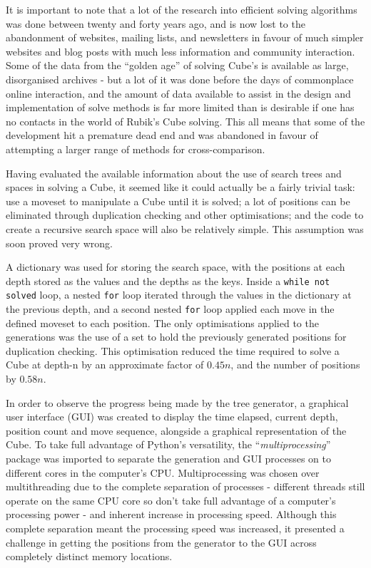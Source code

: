 \documentclass{report}
\newcommand{\tit}[1]{\textit{#1}}
\newcommand{\propernoun}[1]{\enquote{\tit{#1}}}
\newcommand{\depth}[1]{depth-#1}
\newenvironment{aside}{\begin{mdframed}[style=0,%
		leftline=false,rightline=false,leftmargin=2em,rightmargin=2em,%
		innerleftmargin=0pt,innerrightmargin=0pt,linewidth=0.75pt,%
		skipabove=7pt,skipbelow=7pt]\small}
	{\end{mdframed}}
\begin{document}
   	\begin{aside}
   		    It is important to note that a lot of the research into efficient solving algorithms was done between twenty and forty years ago, and is now lost to the abandonment of websites, mailing lists, and newsletters in favour of much simpler websites and blog posts with much less information and community interaction. Some of the data from the \enquote{golden age} of solving Cube's is available as large, disorganised archives  - but a lot of it was done before the days of commonplace online interaction, and the amount of data available to assist in the design and implementation of solve methods is far more limited than is desirable if one has no contacts in the world of Rubik's Cube solving. This all means that some of the development hit a premature dead end and was abandoned in favour of attempting a larger range of methods for cross-comparison.
   	\end{aside}

    Having evaluated the available information about the use of search trees and spaces in solving a Cube, it seemed like it could actually be a fairly trivial task: use a moveset to manipulate a Cube until it is solved; a lot of positions can be eliminated through duplication checking and other optimisations; and the code to create a recursive search space will also be relatively simple. This assumption was soon proved very wrong.
    
    A dictionary was used for storing the search space, with the positions at each depth stored as the values and the depths as the keys. Inside a \lstinline|while not solved| loop, a nested \lstinline|for| loop iterated through the values in the dictionary at the previous depth, and a second nested \lstinline|for| loop applied each move in the defined moveset to each position. The only optimisations applied to the generations was the use of a set to hold the previously generated positions for duplication checking. This optimisation reduced the time required to solve a Cube at \depth{n} by an approximate factor of $0.45n$, and the number of positions by $0.58n$.
    
    In order to observe the progress being made by the tree generator, a graphical user interface (GUI) was created to display the time elapsed, current depth, position count and move sequence, alongside a graphical representation of the Cube. To take full advantage of Python's versatility, the \propernoun{multiprocessing} package was imported to separate the generation and GUI processes on to different cores in the computer's CPU. Multiprocessing was chosen over multithreading due to the complete separation of processes - different threads still operate on the same CPU core so don't take full advantage of a computer's processing power - and inherent increase in processing speed. Although this complete separation meant the processing speed was increased, it presented a challenge in getting the positions from the generator to the GUI across completely distinct memory locations.
    
\end{document}
